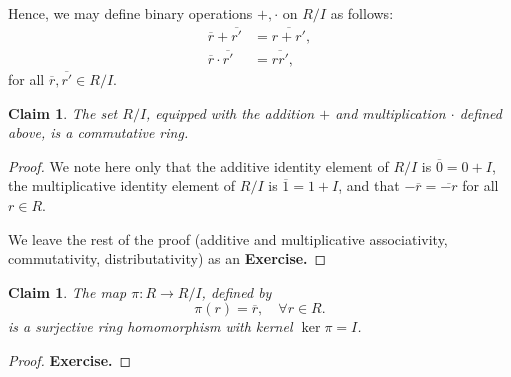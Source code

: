\documentclass[a4paper,12pt]{report}
\newcommand{\ol}[1]{\overline{#1}}
\newcounter{statement}
\numberwithin{statement}{chapter}
\newtheorem{claim}[statement]{Claim}
\numberwithin{equation}{chapter}
\numberwithin{section}{chapter}
\numberwithin{subsection}{section}
\begin{document}
Hence, we may define binary operations $+, \cdot$ on $R/I$ as follows:
\[
\begin{split}
\ol{r} + \ol{r'}  &= \ol{r + r'},\\
\ol{r}\cdot\ol{r'} &= \ol{rr'},
\end{split}
\]
for all $\ol{r},\ol{r'} \in R/ I$.





\begin{claim}
The set $R/I$, equipped with the addition $+$ and multiplication $\cdot$ defined above,
is a commutative ring.
\end{claim}
\begin{proof}

We note here only that the additive identity element of $R/I$ is $\ol{0} = 0 + I$,
the multiplicative identity element of $R/I$ is $\ol{1} = 1 + I$,
and that $-\ol{r} = \ol{-r}$ for all $r \in R$.



We leave the rest of the proof (additive and multiplicative associativity, commutativity, distributativity)
as an  {\bf Exercise.} 

\end{proof}



\begin{claim}

The map $\pi : R \rightarrow R/I$, defined by
\[
\pi(r) = \ol{r},\quad \forall r \in R.
\]
is a surjective ring homomorphism with kernel $\ker \pi = I$.
\end{claim}
\begin{proof}

 {\bf Exercise.} 

\end{proof}
\end{document}

